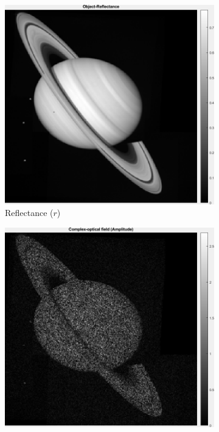 \documentclass[a4paper, 11pt]{article}
\begin{document}
\begin{figure}[h]
\centering
\centering
    \begin{subfigure}[b]{0.22\textwidth}
        \includegraphics[width=\textwidth]{../Figures/OpticalReflectance.png}
        \caption{Reflectance ($r$)}
        \label{fig:reflectanceObject}
    \end{subfigure}
    \begin{subfigure}[b]{0.22\textwidth}
        \includegraphics[width=\textwidth]{../Figures/ComplexOpticalFieldAmplitude.png}

\end{subfigure}
\end{figure}
\end{document}
